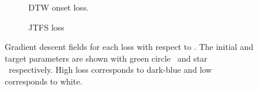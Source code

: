 \begin{figure}[htbp]
\begin{subfigure}[b]{0.49\textwidth}
        \caption{DTW onset loss.}
        \label{fig:p0_dtw}
    \end{subfigure}
    \hfill
    \begin{subfigure}[b]{0.49\textwidth}
        \centering
        \caption{JTFS loss}
        \label{fig:p0_jtfs}
    \end{subfigure}

    \caption{Gradient descent fields for each loss with respect to \BPNoise. The initial and target parameters are shown with green circle \greencircle~and star \greenstar~respectively. High loss corresponds to dark-blue and low corresponds to white.}
    \label{fig:p0_losses}
\end{figure}


